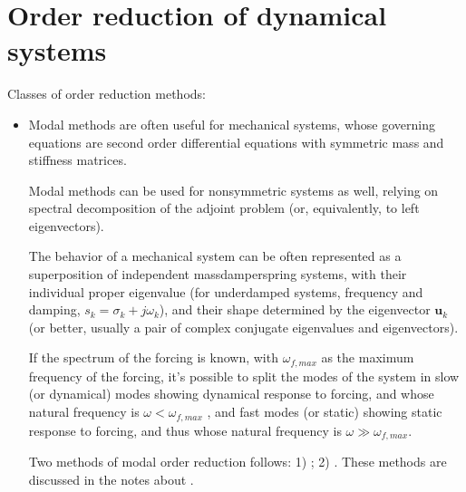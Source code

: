 \documentclass[letterpaper,10pt,english]{jupyterBook}
\begin{document}
\chapter{Order reduction of dynamical systems}
\label{\detokenize{ch/system-theory/order-reduction:order-reduction-of-dynamical-systems}}\label{\detokenize{ch/system-theory/order-reduction:order-reduction-intro}}\label{\detokenize{ch/system-theory/order-reduction::doc}}
\sphinxAtStartPar
Classes of order reduction methods:
\begin{itemize}
\item {} 
\sphinxAtStartPar
{} Modal methods are often useful for mechanical systems, whose governing equations are second order differential equations with symmetric mass and stiffness matrices.%
\begin{footnote}[1]\sphinxAtStartFootnote
Modal methods can be used for non\sphinxhyphen{}symmetric systems as well, relying on spectral decomposition of the adjoint problem (or, equivalently, to left eigenvectors).
%
\end{footnote}

\sphinxAtStartPar
The behavior of a mechanical system can be often represented as a superposition of independent mass\sphinxhyphen{}damper\sphinxhyphen{}spring systems, with their individual proper eigenvalue (for under\sphinxhyphen{}damped systems, frequency and damping, \(s_k = \sigma_k + j \omega_k\)), and their shape determined by the eigenvector \(\mathbf{u}_k\) (or better, usually a pair of complex conjugate eigenvalues and eigenvectors).

\sphinxAtStartPar
If the spectrum of the forcing is known, with \(\omega_{f,max}\) as the maximum frequency of the forcing, it’s possible to split the modes of the system in slow (or dynamical) modes \sphinxhyphen{} showing dynamical response to forcing, and whose natural frequency is \(\omega < \omega_{f,max}\) \sphinxhyphen{}, and fast modes (or static) \sphinxhyphen{} showing static response to forcing, and thus whose natural frequency is \(\omega \gg \omega_{f,max}\).

\sphinxAtStartPar
Two methods of modal order reduction follows: 1) ; 2) . These methods are discussed in the notes about .


\end{itemize}
\end{document}
